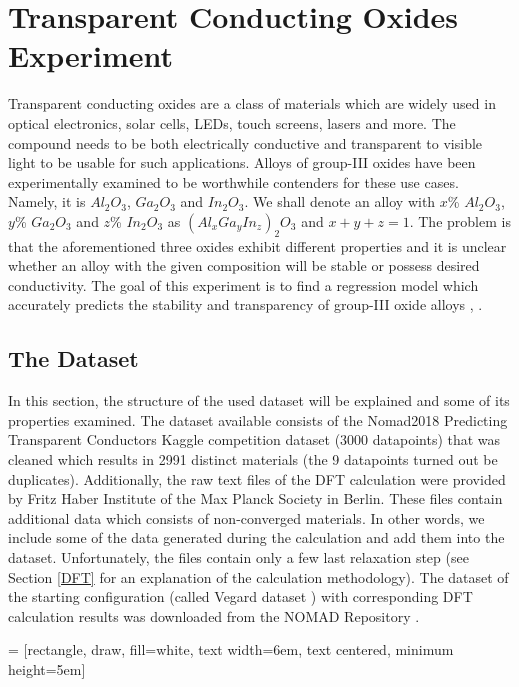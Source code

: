 \documentclass[11pt,oneside,czech,american]{book} %
\theoremstyle{plain}
\theoremstyle{definition}
\begin{document}
\chapter{Transparent Conducting Oxides Experiment}
Transparent conducting oxides are a class of materials which are widely used in optical electronics, solar cells, LEDs, touch screens, lasers and more. The compound needs to be both electrically conductive and transparent to visible light to be usable for such applications. Alloys of group-III oxides have been experimentally examined to be worthwhile contenders for these use cases. Namely, it is $Al_2 O_3$, $Ga_2 O_3$ and $In_2 O_3$. We shall denote an alloy with $x$\% $Al_2 O_3$, $y$\% $Ga_2 O_3$ and $z$\% $In_2 O_3$ as $(Al_{x}Ga_{y}In_{z})_2 O_3$ and $x+y+z=1$. The problem is that the aforementioned three oxides exhibit different properties and it is unclear whether an alloy with the given composition will be stable or possess desired conductivity. The goal of this experiment is to find a regression model which accurately predicts the stability and transparency of group-III oxide alloys \parencite{sutton18}, \parencite{sutton19}.

\section{The Dataset}
In this section, the structure of the used dataset will be explained and some of its properties examined. The dataset available consists of the Nomad2018 Predicting Transparent Conductors Kaggle competition dataset (3000 datapoints) that was cleaned which results in 2991 distinct materials (the 9 datapoints turned out be duplicates). Additionally, the raw text files of the DFT calculation were provided by Fritz Haber Institute of the Max Planck Society in Berlin. These files contain additional data which consists of non-converged materials. In other words, we include some of the data generated during the calculation and add them into the dataset. Unfortunately, the files contain only a few last relaxation step (see Section \ref{DFT} for an explanation of the calculation methodology). The dataset of the starting configuration (called Vegard dataset \parencite{NOMAD_repo}) with corresponding DFT calculation results was downloaded from the NOMAD Repository \parencite{NOMAD_repo}.

 = [rectangle, draw, fill=white, text width=6em, text centered, minimum height=5em]
\end{document}
